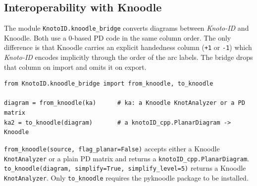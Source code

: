 \subsection{\label{sec:python:knoodle}Interoperability with Knoodle}
The module \lstinline{KnotoID.knoodle_bridge} converts diagrams between {\it Knoto-ID} and Knoodle. Both use a 0-based PD code in the same column order. The only difference is that Knoodle carries an explicit handedness column (\lstinline{+1} or \lstinline{-1}) which {\it Knoto-ID} encodes implicitly through the order of the arc labels. The bridge drops that column on import and omits it on export.
\begin{lstlisting}
from KnotoID.knoodle_bridge import from_knoodle, to_knoodle

diagram = from_knoodle(ka)      # ka: a Knoodle KnotAnalyzer or a PD matrix
ka2 = to_knoodle(diagram)       # a knotoID_cpp.PlanarDiagram -> Knoodle
\end{lstlisting}
\lstinline{from_knoodle(source, flag_planar=False)} accepts either a Knoodle \lstinline{KnotAnalyzer} or a plain PD matrix and returns a \lstinline{knotoID_cpp.PlanarDiagram}. \lstinline{to_knoodle(diagram, simplify=True, simplify_level=5)} returns a Knoodle \lstinline{KnotAnalyzer}. Only \lstinline{to_knoodle} requires the {\ttfamily pyknoodle} package to be installed.
